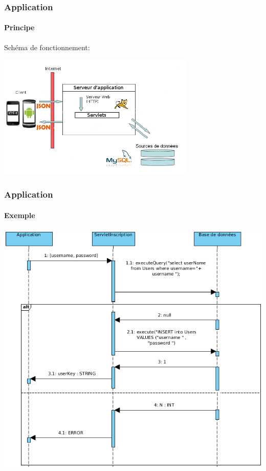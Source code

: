 \begin{frame}
\frametitle{Application}
\framesubtitle{Principe}

	Schéma de fonctionnement:

	\begin{center}
		\includegraphics[width=9.4cm]{img/4.png} 
	\end{center}
	

\end{frame}

\begin{frame}
\frametitle{Application}
\framesubtitle{Exemple}

	\begin{center}
			
	\includegraphics[scale=0.3]{img/sequence.png} 
	
	\end{center}
	

\end{frame}


